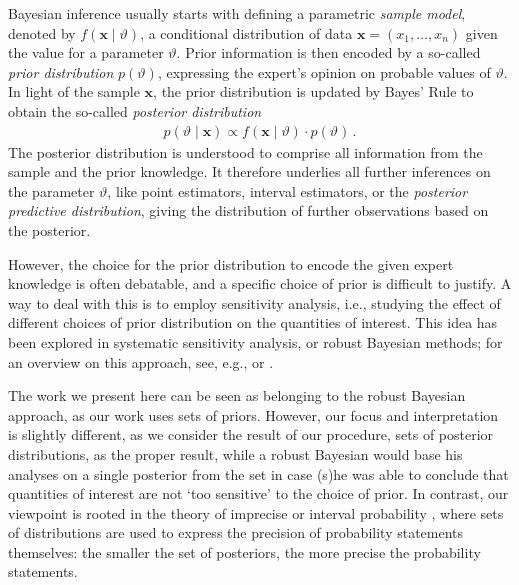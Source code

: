 \documentclass[runningheads,a4paper]{llncs}
\renewcommand{\vec}[1]{{\bm #1}}
\begin{document}
Bayesian inference usually starts with defining a parametric \emph{sample model},
denoted by $f(\vec{x} \mid \vartheta)$,
a conditional distribution of data $\vec{x} = (x_1, \ldots, x_n)$ given the value for a parameter $\vartheta$.
Prior information is then encoded by a so-called \emph{prior distribution} $p(\vartheta)$,
expressing the expert's opinion on probable values of $\vartheta$.
In light of the sample $\vec{x}$, the prior distribution is updated by Bayes' Rule
to obtain the so-called \emph{posterior distribution}
\begin{align}
\label{eq:bayesrule}
p(\vartheta\mid\vec{x}) \propto f(\vec{x}\mid\vartheta) \cdot p(\vartheta)\,.
\end{align}
The posterior distribution is understood to comprise all information from the sample and the prior knowledge.
It therefore underlies all further inferences on the parameter $\vartheta$,
like point estimators, interval estimators,
or the \emph{posterior predictive distribution},
giving the distribution of further observations based on the posterior.

However, the choice for the prior distribution to encode the given expert knowledge is often debatable,
and a specific choice of prior is difficult to justify.
A way to deal with this is to employ sensitivity analysis,
i.e., studying the effect of different choices of prior distribution on the quantities of interest.
This idea has been explored in systematic sensitivity analysis, or robust Bayesian methods;
for an overview on this approach, see, e.g.,
\cite{1994:berger} or \cite{2000:rios}. %

The work we present here can be seen as belonging to the robust Bayesian approach, as our work uses sets of priors.
However, our focus and interpretation is slightly different,
as we consider the result of our procedure, sets of posterior distributions, as the proper result,
while a robust Bayesian would base his analyses on a single posterior from the set
in case (s)he was able to conclude that quantities of interest are not `too sensitive' to the choice of prior.
In contrast, our viewpoint is rooted in the theory of imprecise or interval probability \cite{itip,1991:walley},
where sets of distributions are used to express the precision of probability statements themselves:
the smaller the set of posteriors, the more precise the probability statements.
\end{document}
